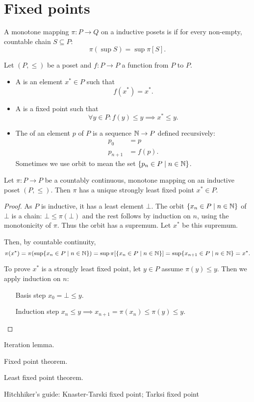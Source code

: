 \chapter{Fixed points}

\begin{definition}
A monotone mapping $\pi : P \to Q$ on a inductive posets
 is  if for every non-empty, countable chain $S\subseteq P$:
 \[ \pi(\sup S) = \sup\pi[S]. \]
\end{definition}

\begin{definition}
Let $(P,\leq)$ be a poset and $f: P\to P$ a function from $P$ to $P$.
\begin{itemize}
\item A  is an element $x^*\in P$ such that
\[ f(x^*) = x^*. \]
\item A  is a fixed point such that
\[ \forall y\in P: f(y)\leq y \implies x^* \leq y. \]
\item The  of an element $p$ of $P$ is a sequence $\mathbb{N}\to P$ defined recursively:
\begin{align*}
p_0 &= p \\
p_{n+1} &= f(p).
\end{align*}
Sometimes we use orbit to mean the set $\{p_n\in P\;|\; n\in \mathbb{N}\}$.
\end{itemize}
\end{definition}

\begin{theorem}
Let $\pi:P\to P$ be a countably continuous, monotone mapping on an inductive poset $(P,\leq)$. Then $\pi$ has a unique strongly least fixed point $x^*\in P$.
\end{theorem}
\begin{proof}
As $P$ is inductive, it has a least element $\bot$. The orbit $\{x_n\in P\;|\; n\in \mathbb{N}\}$ of $\bot$ is a chain: $\bot \leq \pi(\bot)$ and the rest follows by induction on $n$, using the monotonicity of $\pi$. Thus the orbit has a supremum. Let $x^*$ be this supremum.

Then, by countable continuity,
\[ \pi(x^*) = \pi(\sup\{x_n\in P\;|\; n\in \mathbb{N}\}) = \sup\pi[\{x_n\in P\;|\; n\in \mathbb{N}\}] = \sup\{x_{n+1}\in P\;|\; n\in \mathbb{N}\} = x^*. \]

To prove $x^*$ is a strongly least fixed point, let $y\in P$ assume $\pi(y)\leq y$. Then we apply induction on $n$:
\begin{itemize}[leftmargin=3cm]
\item[Basis step] $x_0 = \bot \leq y$.
\item[Induction step] $x_n \leq y \implies x_{n+1} = \pi(x_n)\leq \pi(y) \leq y$.
\end{itemize}
\end{proof}

Iteration lemma.

Fixed point theorem.

Least fixed point theorem.

Hitchhiker's guide:
Knaster-Tarski fixed point; Tarksi fixed point

